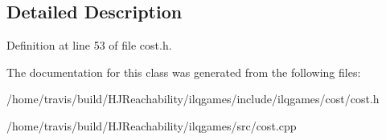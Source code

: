 \subsection{Detailed Description}


Definition at line 53 of file cost.\+h.



The documentation for this class was generated from the following files\+:\begin{DoxyCompactItemize}
\item 
/home/travis/build/\+H\+J\+Reachability/ilqgames/include/ilqgames/cost/cost.\+h\item 
/home/travis/build/\+H\+J\+Reachability/ilqgames/src/cost.\+cpp\end{DoxyCompactItemize}
